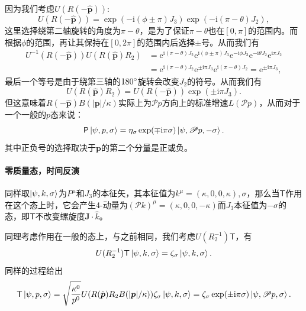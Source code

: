 因为我们考虑$U( R( -\hat{\boldsymbol{p}}))$:
\begin{equation*}
	U( R( -\hat{\boldsymbol{p}})) =\exp( -\mathrm{i}( \phi \pm \pi ) J_{3})\exp( -\mathrm{i}( \pi -\theta ) J_{2}) ,
\end{equation*}
这里选择绕第二轴旋转的角度为$\pi -\theta $，是为了保证$\pi -\theta $也在$[ 0,\pi ]$的范围内。而根据$\phi $的范围，再让其保持在$[ 0,2\pi ]$的范围内后选择$\pm $号。从而我们有
\begin{equation*}
	\begin{aligned}
		U^{-1}( R( -\hat{\boldsymbol{p}})) U( R(\hat{\boldsymbol{p}}) R_{2}) & =\mathrm{e}^{\mathrm{i}( \pi -\theta ) J_{2}}\mathrm{e}^{\mathrm{i}( \phi \pm \pi ) J_{3}}\mathrm{e}^{-\mathrm{i} \phi J_{3}}\mathrm{e}^{-\mathrm{i} \theta J_{2}}\mathrm{e}^{\mathrm{i} \pi J_{2}}\\
		& =\mathrm{e}^{\mathrm{i}( \pi -\theta ) J_{2}}\mathrm{e}^{\pm \mathrm{i} \pi J_{3}}\mathrm{e}^{\mathrm{i}( \pi -\theta ) J_{2}} =\mathrm{e}^{\pm \mathrm{i} \pi J_{3}} ,
	\end{aligned}
\end{equation*}
最后一个等号是由于绕第三轴的$180\degree $旋转会改变$J_{2}$的符号。从而我们有
\begin{equation*}
	U( R(\hat{\boldsymbol{p}}) R_{2}) =U( R( -\hat{\boldsymbol{p}}))\exp( \pm \mathrm{i} \pi J_{3}) .
\end{equation*}
但这意味着$R( -\hat{\boldsymbol{p}}) B(| \boldsymbol{p}| /\kappa )$实际上为$\mathscr{P} p$方向上的标准增速$L(\mathscr{P} p)$，从而对于一个一般的$p$态来说：
\begin{equation*}
	\mathsf{P}\ket{\psi ,p,\sigma } =\eta _{\sigma }\exp( \mp \mathrm{i} \pi \sigma )\ket{\psi ,\mathscr{P} p,-\sigma } .
\end{equation*}
其中正负号的选择取决于$\boldsymbol{p}$的第二个分量是正或负。

\paragraph{零质量态，时间反演}
同样取$ \ket{\psi ,k,\sigma }$为$ P^{\mu }$和$ J_{3}$的本征矢，其本征值为$ k^{\mu } =( \kappa ,0,0,\kappa ) ,\sigma $，那么当$ \mathsf{T}$作用在这个态上时，它会产生4-动量为$ (\mathscr{P} k)^{\mu } =( \kappa ,0,0,-\kappa )$而$ J_{3}$本征值为$ -\sigma $的态，即$\mathsf{T}$不改变螺旋度$\boldsymbol{J} \cdot \hat{k}$。

同理考虑作用在一般的态上，与之前相同，我们考虑$U(R_{2}^{-1} )\mathsf{T}$，有
\begin{equation*}
	U(R_{2}^{-1} )\mathsf{T}\ket{\psi ,k,\sigma } =\zeta _{\sigma }\ket{\psi ,k,\sigma } .
\end{equation*}
同样的过程给出
\begin{equation*}
	\mathsf{T}\ket{\psi ,p,\sigma } =\sqrt{\frac{\kappa ^{0}}{p^{0}}} U( R(\hat{\boldsymbol{p}}) R_{2} B(| \boldsymbol{p}| /\kappa )) \zeta _{\sigma }\ket{\psi ,k,\sigma } =\zeta _{\sigma }\exp( \pm \mathrm{i} \pi \sigma )\ket{\psi ,\mathscr{P} p,\sigma } .
\end{equation*}

